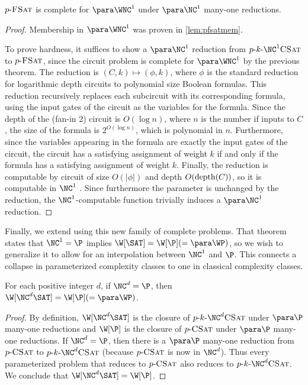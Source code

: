 \begin{theorem}\label{thm:pfsatcomplete}
  $p \textnormal{-} \textsc{FSat}$ is complete for $\para \WNC^1$ under $\para \NC^1$ many-one reductions.
\end{theorem}
\begin{proof}
  Membership in $\para \WNC^1$ was proven in \autoref{lem:pfsatmem}.

  To prove hardness, it suffices to show a $\para \NC^1$ reduction from $p \dash k \dash \NC^1 \textsc{CSat}$ to $p \textnormal{-} \textsc{FSat}$, since the circuit problem is complete for $\para \WNC^1$ by the previous theorem.
  The reduction is $(C, k) \mapsto (\phi, k)$, where $\phi$ is the standard reduction for logarithmic depth circuits to polynomial size Boolean formulas.
  This reduction recursively replaces each subcircuit with its corresponding formula, using the input gates of the circuit as the variables for the formula.
  Since the depth of the (fan-in 2) circuit is $O(\log n)$, where $n$ is the number if inputs to $C$, the size of the formula is $2^{O(\log n)}$, which is polynomial in $n$.
  Furthermore, since the variables appearing in the formula are exactly the input gates of the circuit, the circuit has a satisfying assignment of weight $k$ if and only if the formula has a satisfying assignment of weight $k$.
  Finally, the reduction is computable by circuit of size $O(|\phi|)$ and depth $O(\operatorname{depth}(C))$, so it is computable in $\NC^1$ .
  Since furthermore the parameter is unchanged by the reduction, the $\NC^1$-computable function trivially induces a $\para \NC^1$ reduction.
\end{proof}

Finally, we extend \autocite[Corollary~3.7]{est15} using this new family of complete problems.
That theorem states that $\NC^1 = \P$ implies $\W[\SAT] = \W[\P] (= \para \WP)$, so we wish to generalize it to allow for an interpolation between $\NC^1$ and $\P$.
This connects a collapse in parameterized complexity classes to one in classical complexity classes.

\begin{corollary}
  For each positive integer $d$, if $\NC^d = \P$, then $\W[\NC^d \SAT] = \W[\P] (= \para \WP)$.
\end{corollary}
\begin{proof}
  By definition, $\W[\NC^d \SAT]$ is the closure of $\pNCSAT$ under $\para \P$ many-one reductions and $\W[\P]$ is the closure of $p \textnormal{-} \textsc{CSat}$ under $\para \P$ many-one reductions.
  If $\NC^d = \P$, then there is a $\para \P$ many-one reduction from $p \textnormal{-} \textsc{CSat}$ to $\pNCSAT$ (because $p \textnormal{-} \textsc{CSat}$ is now in $\NC^d$).
  Thus every parameterized problem that reduces to $p \textnormal{-} \textsc{CSat}$ also reduces to $\pNCSAT$.
  We conclude that $\W[\NC^d \SAT] = \W[\P]$.
\end{proof}

